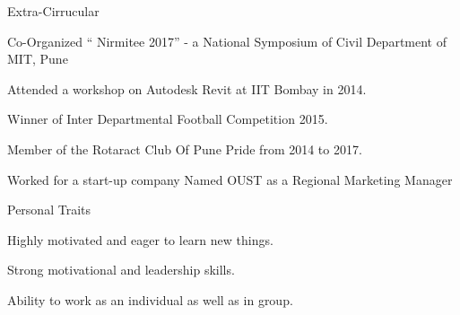 \documentclass{resume} %
\begin{document}
\begin{rSection}{Extra-Cirrucular} \itemsep -3pt
  \item Co-Organized “ Nirmitee 2017” - a National Symposium of Civil Department of MIT, Pune
  \item Attended a workshop on Autodesk Revit at IIT Bombay in 2014.
  \item Winner of Inter Departmental Football Competition 2015.
  \item Member of the  Rotaract Club Of Pune Pride from 2014 to 2017.
  \item Worked for a start-up company Named OUST as a Regional Marketing Manager

\end{rSection}

\begin{rSection}{Personal Traits}
  \item Highly motivated and eager to learn new things.
  \item Strong motivational and leadership skills.
  \item Ability to work as an individual as well as in group.
\end{rSection}
\end{document}
